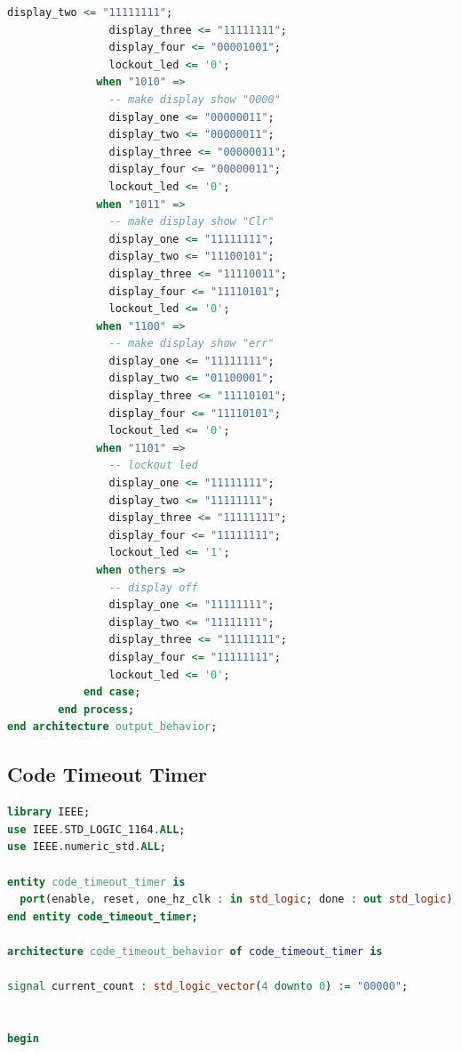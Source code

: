 \documentclass[11pt]{article}
\begin{document}
\begin{appendices}
\begin{lstlisting}[language=VHDL]
                display_two <= "11111111";
                display_three <= "11111111";
                display_four <= "00001001";
                lockout_led <= '0';
              when "1010" =>
                -- make display show "0000"
                display_one <= "00000011";
                display_two <= "00000011";
                display_three <= "00000011";
                display_four <= "00000011";
                lockout_led <= '0';
              when "1011" =>
                -- make display show "Clr"
                display_one <= "11111111";
                display_two <= "11100101";
                display_three <= "11110011";
                display_four <= "11110101";
                lockout_led <= '0';
              when "1100" =>
                -- make display show "err"
                display_one <= "11111111";
                display_two <= "01100001";
                display_three <= "11110101";
                display_four <= "11110101";
                lockout_led <= '0';
              when "1101" =>
                -- lockout led
                display_one <= "11111111";
                display_two <= "11111111";
                display_three <= "11111111";
                display_four <= "11111111";
                lockout_led <= '1';
              when others =>
                -- display off
                display_one <= "11111111";
                display_two <= "11111111";
                display_three <= "11111111";
                display_four <= "11111111";
                lockout_led <= '0';
            end case;
        end process;
end architecture output_behavior;

\end{lstlisting}

\subsection{Code Timeout Timer}

\begin{lstlisting}[language=VHDL]
library IEEE;
use IEEE.STD_LOGIC_1164.ALL;
use IEEE.numeric_std.ALL;

entity code_timeout_timer is
  port(enable, reset, one_hz_clk : in std_logic; done : out std_logic);
end entity code_timeout_timer;

architecture code_timeout_behavior of code_timeout_timer is

signal current_count : std_logic_vector(4 downto 0) := "00000";


begin


\end{lstlisting}
\end{appendices}
\end{document}
